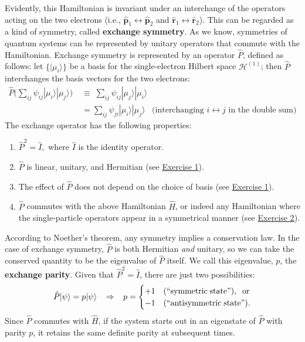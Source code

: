 \documentclass[pra,12pt]{revtex4}
\begin{document}
Evidently, this Hamiltonian is invariant under an interchange of the
operators acting on the two electrons (i.e., $\hat{\mathbf{p}}_1
\leftrightarrow \hat{\mathbf{p}}_2$ and $\hat{\mathbf{r}}_1
\leftrightarrow \hat{\mathbf{r}}_2$).  This can be regarded as a kind
of symmetry, called \textbf{exchange symmetry}.  As we know,
symmetries of quantum systems can be represented by unitary operators
that commute with the Hamiltonian.  Exchange symmetry is represented
by an operator $\hat{P}$, defined as follows: let $\{|\mu_i\rangle\}$
be a basis for the single-electron Hilbert space $\mathscr{H}^{(1)}$;
then $\hat{P}$ interchanges the basis vectors for the two electrons:
$$\begin{aligned}\hat{P} \Big (\sum_{ij} \psi_{ij} |\mu_i\rangle|\mu_j\rangle \Big)
\;&\equiv\;  \sum_{ij} \psi_{ij} |\mu_j\rangle|\mu_i\rangle \\&= \sum_{ij} \psi_{ji} |\mu_i\rangle|\mu_j\rangle \;\;\;\textrm{(interchanging $i\leftrightarrow j$ in the double sum)}\end{aligned}$$
The exchange operator has the following properties:
\begin{enumerate}
\item $\hat{P}^2 = \hat{I},$ where $\hat{I}$ is the identity operator.

\item $\hat{P}$ is linear, unitary, and Hermitian (see
  \hyperref[ex:1]{Exercise 1}).
  
\item The effect of $\hat{P}$ does not depend on the choice
  of basis (see \hyperref[ex:1]{Exercise 1}).

\item $\hat{P}$ commutes with the above Hamiltonian $\hat{H}$, or
  indeed any Hamiltonian where the single-particle operators appear in
  a symmetrical manner (see \hyperref[ex:2]{Exercise 2}).
\end{enumerate}

According to Noether's theorem, any symmetry implies a conservation
law.  In the case of exchange symmetry, $\hat{P}$ is both Hermitian
\textit{and} unitary, so we can take the conserved quantity to be the
eigenvalue of $\hat{P}$ itself.  We call this eigenvalue, $p$, the
\textbf{exchange parity}.  Given that $\hat{P}^2 = \hat{I}$, there are
just two possibilities:
$$\hat{P} |\psi\rangle = p|\psi\rangle \;\;\;\Rightarrow\;\;\; p = \begin{cases}+1 & \textrm{(``symmetric\;state'')}, \;\;\textrm{or} \\ -1 & \textrm{(``antisymmetric\;state'').}\end{cases}$$
Since $\hat{P}$ commutes with $\hat{H}$, if the system starts out in
an eigenstate of $\hat{P}$ with parity $p$, it retains the same
definite parity at subsequent times.
\end{document}
